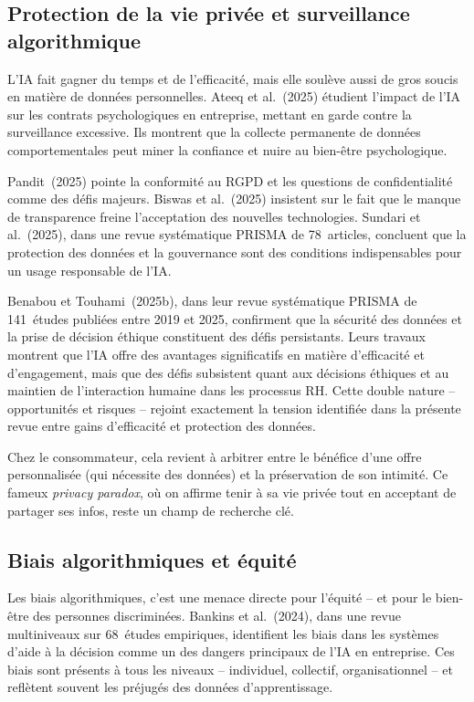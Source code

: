 \documentclass[12pt,a4paper]{article}
\begin{document}
\subsection{Protection de la vie privée et surveillance algorithmique}

L'IA fait gagner du temps et de l'efficacité, mais elle soulève aussi de gros soucis en matière
de données personnelles. Ateeq et al.~(2025) étudient l'impact de l'IA sur les contrats
psychologiques en entreprise, mettant en garde contre la surveillance excessive. Ils montrent
que la collecte permanente de données comportementales peut miner la confiance et nuire
au bien-être psychologique.

Pandit~(2025) pointe la conformité au RGPD et les questions de confidentialité comme des
défis majeurs. Biswas et al.~(2025) insistent sur le fait que le manque de transparence
freine l'acceptation des nouvelles technologies. Sundari et al.~(2025), dans une revue
systématique PRISMA de 78~articles, concluent que la protection des données et la
gouvernance sont des conditions indispensables pour un usage responsable de l'IA.

Benabou et Touhami~(2025b), dans leur revue systématique PRISMA de 141~études publiées
entre 2019 et 2025, confirment que la sécurité des données et la prise de décision éthique
constituent des défis persistants. Leurs travaux montrent que l'IA offre des avantages
significatifs en matière d'efficacité et d'engagement, mais que des défis subsistent quant
aux décisions éthiques et au maintien de l'interaction humaine dans les processus RH.
Cette double nature -- opportunités et risques -- rejoint exactement la tension identifiée
dans la présente revue entre gains d'efficacité et protection des données.

Chez le consommateur, cela revient à arbitrer entre le bénéfice d'une offre personnalisée
(qui nécessite des données) et la préservation de son intimité. Ce fameux \emph{privacy
paradox}, où on affirme tenir à sa vie privée tout en acceptant de partager ses infos, reste
un champ de recherche clé.

\subsection{Biais algorithmiques et équité}

Les biais algorithmiques, c'est une menace directe pour l'équité -- et pour le bien-être
des personnes discriminées. Bankins et al.~(2024), dans une revue multiniveaux sur
68~études empiriques, identifient les biais dans les systèmes d'aide à la décision comme un
des dangers principaux de l'IA en entreprise. Ces biais sont présents à tous les niveaux
-- individuel, collectif, organisationnel -- et reflètent souvent les préjugés des données
d'apprentissage.
\end{document}
